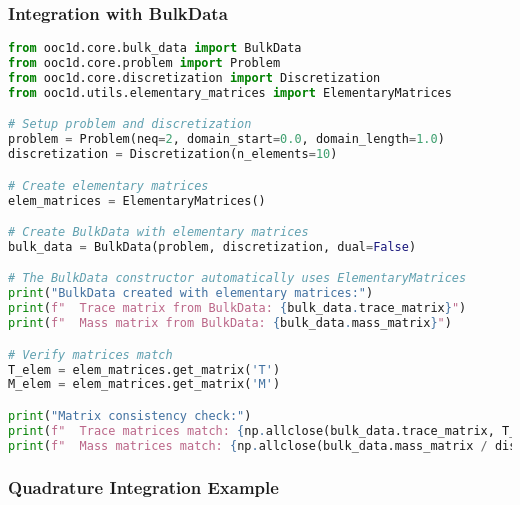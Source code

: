 \subsubsection{Integration with BulkData}

\begin{lstlisting}[language=Python, caption=BulkData Integration Example]
from ooc1d.core.bulk_data import BulkData
from ooc1d.core.problem import Problem
from ooc1d.core.discretization import Discretization
from ooc1d.utils.elementary_matrices import ElementaryMatrices

# Setup problem and discretization
problem = Problem(neq=2, domain_start=0.0, domain_length=1.0)
discretization = Discretization(n_elements=10)

# Create elementary matrices
elem_matrices = ElementaryMatrices()

# Create BulkData with elementary matrices
bulk_data = BulkData(problem, discretization, dual=False)

# The BulkData constructor automatically uses ElementaryMatrices
print("BulkData created with elementary matrices:")
print(f"  Trace matrix from BulkData: {bulk_data.trace_matrix}")
print(f"  Mass matrix from BulkData: {bulk_data.mass_matrix}")

# Verify matrices match
T_elem = elem_matrices.get_matrix('T')
M_elem = elem_matrices.get_matrix('M')

print("Matrix consistency check:")
print(f"  Trace matrices match: {np.allclose(bulk_data.trace_matrix, T_elem)}")
print(f"  Mass matrices match: {np.allclose(bulk_data.mass_matrix / discretization.element_length, M_elem)}")
\end{lstlisting}

\subsubsection{Quadrature Integration Example}

